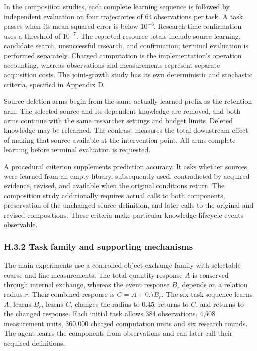 \documentclass[11pt,a4paper]{article}
\begin{document}
In the composition studies, each complete learning sequence is followed by independent evaluation on four trajectories of 64 observations per task. A task passes when its mean squared error is below \(10^{-6}\). Research-time confirmation uses a threshold of \(10^{-7}\). The reported resource totals include source learning, candidate search, unsuccessful research, and confirmation; terminal evaluation is performed separately. Charged computation is the implementation's operation accounting, whereas observations and measurements represent separate acquisition costs. The joint-growth study has its own deterministic and stochastic criteria, specified in Appendix D.


Source-deletion arms begin from the same actually learned prefix as the retention arm. The selected source and its dependent knowledge are removed, and both arms continue with the same researcher settings and budget limits. Deleted knowledge may be relearned. The contrast measures the total downstream effect of making that source available at the intervention point. All arms complete learning before terminal evaluation is requested.


A procedural criterion supplements prediction accuracy. It asks whether sources were learned from an empty library, subsequently used, contradicted by acquired evidence, revised, and available when the original conditions return. The composition study additionally requires actual calls to both components, preservation of the unchanged source definition, and later calls to the original and revised compositions. These criteria make particular knowledge-lifecycle events observable.


\subsubsection*{H.3.2 Task family and supporting mechanisms}

The main experiments use a controlled object-exchange family with selectable coarse and fine measurements. The total-quantity response \(A\) is conserved through internal exchange, whereas the event response \(B_r\) depends on a relation radius \(r\). Their combined response is \(C=A+0.7B_r\). The six-task sequence learns \(A\), learns \(B_r\), learns \(C\), changes the radius to \(0.45\), returns to \(C\), and returns to the changed response. Each initial task allows 384 observations, 4,608 measurement units, 360,000 charged computation units and six research rounds. The agent learns the components from observations and can later call their acquired definitions.
\end{document}

